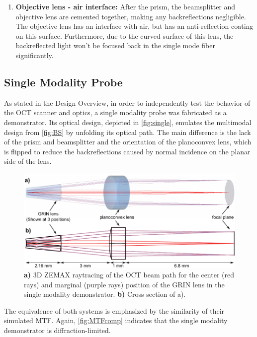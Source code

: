 \begin{enumerate}
\item \textbf{Objective lens - air interface:} After the prism, the beamsplitter and objective lens are cemented together, making any backreflections negligible. The objective lens has an interface with air, but has an anti-reflection coating on this surface. Furthermore, due to the curved surface of this lens, the backreflected light won't be focused back in the single mode fiber significantly.
\end{enumerate}


\subsection{Single Modality Probe}
As stated in the Design Overview, in order to independently test the behavior of the OCT scanner and optics, a single modality probe was fabricated as a demonstrator. Its optical design, depicted in \autoref{fig:single}, emulates the multimodal design from \autoref{fig:BS} by unfolding its optical path. The main difference is the lack of the prism and beamsplitter and the orientation of the planoconvex lens, which is flipped to reduce the backreflections caused by normal incidence on the planar side of the lens.

\begin{figure}[h!]\centering
      \includegraphics[width=12cm]{figures/30_DesignSimulation/Optical/singleAll.pdf}
      \caption{\textbf{a)} 3D ZEMAX raytracing of the OCT beam path for the center (red rays) and marginal (purple rays) position of the GRIN lens in the single modality demonstrator.
      \textbf{b)} Cross section of a).}
      \label{fig:single}
\end{figure}

The equivalence of both systems is emphasized by the similarity of their simulated MTF. Again, \autoref{fig:MTFcomp} indicates that the single modality demonstrator is diffraction-limited.

